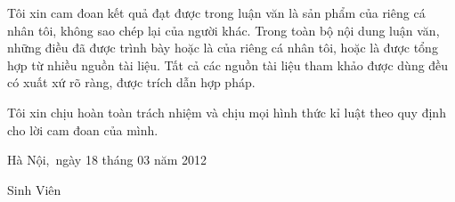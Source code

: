 


\begin{declaration}        %

Tôi xin cam đoan kết quả đạt được trong luận văn là sản phẩm của riêng cá 
nhân tôi, không sao chép lại của người khác. Trong toàn bộ nội dung luận văn, 
những điều đã được trình bày hoặc là của riêng cá nhân tôi, hoặc là được tổng 
hợp từ nhiều nguồn tài liệu. Tất cả các nguồn tài liệu tham khảo được dùng đều 
có xuất xứ rõ ràng, được trích dẫn hợp pháp.  

Tôi xin chịu hoàn toàn trách nhiệm và chịu mọi hình thức kỉ luật theo quy 
định cho lời cam đoan của mình.

	
\qquad \qquad\qquad \qquad\qquad \qquad		Hà Nội,~ngày 18 tháng 03 năm 2012

	\qquad \qquad\qquad \qquad\qquad \quad\qquad \qquad\qquad \qquad Sinh Viên

	


\end{declaration}


